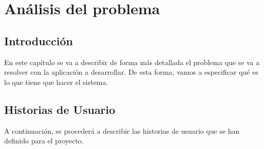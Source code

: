 \chapter{Análisis del problema}

\section{Introducción}
En este capítulo se va a describir de forma más detallada el problema que se va a resolver con la aplicación a desarrollar. De esta forma, vamos a especificar qué es lo que 
tiene que hacer el sistema.  
\section{Historias de Usuario}
A continuación, se procederá a describir las historias de usuario que se han definido para el proyecto. 
